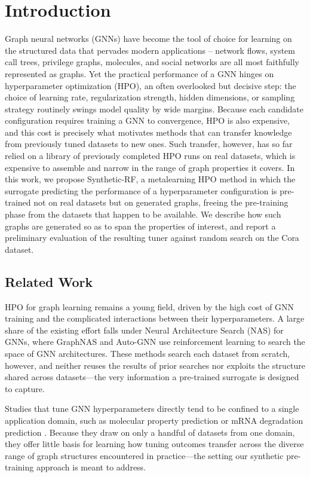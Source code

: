 \section{Introduction}

Graph neural networks (GNNs) have become the tool of choice for learning on the structured data that pervades modern applications -- network flows, system call trees, privilege graphs, molecules, and social networks are all most faithfully represented as graphs. Yet the practical performance of a GNN hinges on hyperparameter optimization (HPO), an often overlooked but decisive step: the choice of learning rate, regularization strength, hidden dimensions, or sampling strategy routinely swings model quality by wide margins. Because each candidate configuration requires training a GNN to convergence, HPO is also expensive, and this cost is precisely what motivates methods that can transfer knowledge from previously tuned datasets to new ones. Such transfer, however, has so far relied on a library of previously completed HPO runs on real datasets, which is expensive to assemble and narrow in the range of graph properties it covers. In this work, we propose Synthetic-RF, a metalearning HPO method in which the surrogate predicting the performance of a hyperparameter configuration is pre-trained not on real datasets but on generated graphs, freeing the pre-training phase from the datasets that happen to be available. We describe how such graphs are generated so as to span the properties of interest, and report a preliminary evaluation of the resulting tuner against random search on the Cora dataset.

\subsection{Related Work}\label{sec:related-work}

HPO for graph learning remains a young field, driven by the high cost of GNN training and the complicated interactions between their hyperparameters. A large share of the existing effort falls under Neural Architecture Search (NAS) for GNNs, where GraphNAS \cite{gao_graph_2020} and Auto-GNN \cite{zhou_auto-gnn_2022} use reinforcement learning to search the space of GNN architectures. These methods search each dataset from scratch, however, and neither reuses the results of prior searches nor exploits the structure shared across datasets—the very information a pre-trained surrogate is designed to capture.

Studies that tune GNN hyperparameters directly tend to be confined to a single application domain, such as molecular property prediction \cite{yuan_genetic_2021, yuan_systematic_2021, yuan_which_2021, ebadi_hyperparameter_2025} or mRNA degradation prediction \cite{vodilovska_hyperparameter_2023}. Because they draw on only a handful of datasets from one domain, they offer little basis for learning how tuning outcomes transfer across the diverse range of graph structures encountered in practice—the setting our synthetic pre-training approach is meant to address.

